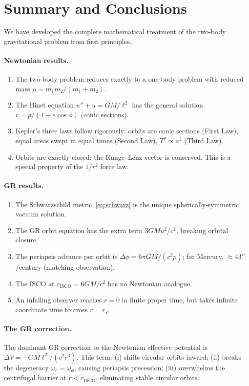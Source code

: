 \documentclass[12pt,a4paper]{article}
\theoremstyle{plain}
\theoremstyle{definition}
\theoremstyle{remark}
\newcommand{\leff}{\ell}  %
\begin{document}
\section{Summary and Conclusions}

We have developed the complete mathematical treatment of the two-body gravitational problem from first principles.

\paragraph{Newtonian results.}
\begin{enumerate}
  \item The two-body problem reduces exactly to a one-body problem with reduced mass $\mu=m_1m_2/(m_1+m_2)$.
  \item The Binet equation $u''+u = GM/\leff^2$ has the general solution $r = p/(1+e\cos\phi)$ (conic sections).
  \item Kepler's three laws follow rigorously: orbits are conic sections (First Law), equal areas swept in equal times (Second Law), $T^2\propto a^3$ (Third Law).
  \item Orbits are exactly closed; the Runge--Lenz vector is conserved. This is a special property of the $1/r^2$ force law.
\end{enumerate}

\paragraph{GR results.}
\begin{enumerate}
  \item The Schwarzschild metric~\eqref{eq:schwarz} is the unique spherically-symmetric vacuum solution.
  \item The GR orbit equation has the extra term $3GMu^2/c^2$, breaking orbital closure.
  \item The periapsis advance per orbit is $\Delta\phi = 6\pi GM/(c^2 p)$; for Mercury, $\approx43''$/century (matching observation).
  \item The ISCO at $r_{\mathrm{ISCO}}=6GM/c^2$ has no Newtonian analogue.
  \item An infalling observer reaches $r=0$ in finite proper time, but takes infinite coordinate time to cross $r=r_s$.
\end{enumerate}

\paragraph{The GR correction.} The dominant GR correction to the Newtonian effective potential is $\Delta V = -GM\leff^2/(c^2r^3)$. This term: (i) shifts circular orbits inward; (ii) breaks the degeneracy $\omega_r=\omega_\phi$, causing periapsis precession; (iii) overwhelms the centrifugal barrier at $r < r_{\mathrm{ISCO}}$, eliminating stable circular orbits.
\end{document}
